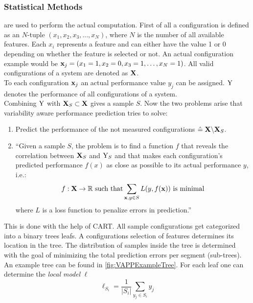 \FloatBarrier %
\subsubsection{Statistical Methods}\label{sec:VAPPMethods}  are used to perform the actual computation. First of all a configuration is defined as an $N$-tuple $(x_1,x_2,x_3,...,x_N)$, where $N$ is the number of all available features. Each $x_i$ represents a feature and can either have the value 1 or 0 depending on whether the feature is selected or not. An actual configuration example would be $\mathrm{\mathbf{x}}_j = (x_1=1,x_2=0,x_3=1,\dots,x_N = 1)$. All valid configurations of a system are denoted as $\mathbf{X}$.\\
To each configuration $\mathrm{\mathbf{x}}_j$ an actual performance value $y_j$ can be assigned. $\mathrm{Y}$ denotes the performance of all configurations of a system.\\
Combining $\mathrm{Y}$ with $\mathbf{X}_S\subset\mathbf{X}$ gives a sample $S$. Now the two problems arise that variability aware performance prediction tries to solve:
\begin{enumerate}
	\item Predict the performance of the not measured configurations $\hat{=}\;\mathbf{X}\backslash\mathbf{X}_S$.
	\item ``Given a sample $S$, the problem is to find a function $f$ that reveals the correlation between $\mathbf{X}_S$ and $\mathrm{Y}_S$ and that makes each configuration’s predicted performance $f(x)$ as close as possible to its actual performance $y$, i.e.:
	\begin{equation}
	f : \mathbf{X} \rightarrow  \mathbb{R} \text{ such that} \sum_{\mathrm{\mathbf{x}},y \in S} L(y,f(\mathrm{\mathbf{x}})) \text{ is minimal}
	\end{equation} 	where $L$ is a loss function to penalize errors in prediction.''\cite{VariabilityAwarePerformancePredictionJianmeiSigmundApel}
\end{enumerate}
This is done with the help of CART. All sample configurations get categorized into a binary trees leafs. A configurations selection of features determines its location in the tree. The distribution of samples inside the tree is determined with the goal of minimizing the total prediction errors per segment (sub-trees). An example tree can be found in \cref{fig:VAPPExampleTree}.
For each leaf one can determine the \textit{local model} $\ell$
\begin{equation}
	\ell_{S_i} = \frac{1}{|S_i|} \sum_{y_j \in S_i} y_j
\end{equation}
